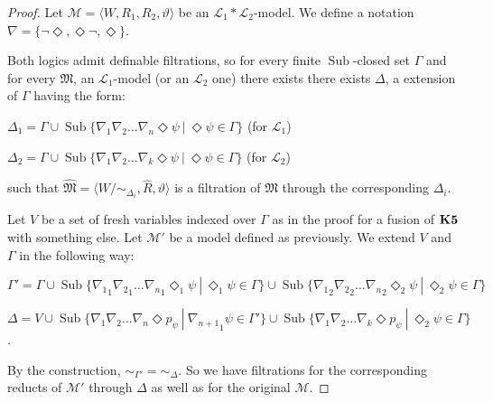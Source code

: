 \documentclass[a4paper]{article}
\theoremstyle{defin}
\theoremstyle{theorem}
\theoremstyle{prop}
\theoremstyle{lemma}
\theoremstyle{fact}
\theoremstyle{exercise}
\theoremstyle{ex}
\theoremstyle{col}
\theoremstyle{claim}
\begin{document}
\begin{proof}
  Let $\mathcal{M} = \langle W, R_1, R_2, \vartheta \rangle$ be an $\mathcal{L}_1 * \mathcal{L}_2$-model. We define a notation $\nabla = \{ \neg \Diamond, \Diamond \neg, \Diamond \}$.

  Both logics admit definable filtrations, so for every finite $\operatorname{Sub}$-closed set $\Gamma$ and for every $\mathfrak{M}$, an $\mathcal{L}_1$-model (or an $\mathcal{L}_2$ one) there exists there exists $\Delta$, a extension of $\Gamma$ having the form:
  \begin{center}
    $\Delta_1 = \Gamma \cup \operatorname{Sub}\{ \nabla_1 \nabla_2 \dots \nabla_n \Diamond \psi \: | \: \Diamond \psi \in \Gamma \}$ (for $\mathcal{L}_1$)

    $\Delta_2 = \Gamma \cup \operatorname{Sub}\{ \nabla_1 \nabla_2 \dots \nabla_k \Diamond \psi \: | \: \Diamond \psi \in \Gamma \}$ (for $\mathcal{L}_2$)
  \end{center}
  such that $\widehat{\mathfrak{M}} = \langle W / \sim_{\Delta_i}, \widehat{R}, \vartheta \rangle$ is a filtration of $\mathfrak{M}$ through the corresponding $\Delta_i$.

  Let $V$ be a set of fresh variables indexed over $\Gamma$ as in the proof for a fusion of ${\bf K5}$ with something else. Let $\mathcal{M}'$ be a model defined as previously. We extend $V$ and $\Gamma$ in the following way:

\begin{center}
  $\Gamma' = \Gamma \cup \operatorname{Sub}\{ {\nabla_1}_1 {\nabla_2}_1 \dots {\nabla_n}_1 \Diamond_1 \psi \: | \: \Diamond_1 \psi \in \Gamma \} \cup \operatorname{Sub}\{ {\nabla_1}_2 {\nabla_2}_2 \dots {\nabla_n}_2 \Diamond_2 \psi \: | \: \Diamond_2 \psi \in \Gamma \}$

  $\Delta = V \cup \operatorname{Sub}\{ \nabla_1 \nabla_2 \dots \nabla_n \Diamond p_{\psi} \: | \: {\nabla_{n + 1}}_1 \psi \in \Gamma' \} \cup \operatorname{Sub}\{ \nabla_1 \nabla_2 \dots \nabla_k \Diamond p_{\psi} \: | \: \Diamond_2 \psi \in \Gamma \}$.
\end{center}
By the construction, $\sim_{\Gamma'} = \sim_{\Delta}$. So we have filtrations for the corresponding reducts of $\mathcal{M}'$ through $\Delta$ as well as for the original $\mathcal{M}$.
\end{proof}



\end{document}
